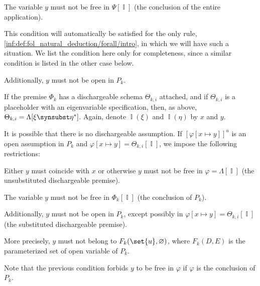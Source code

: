 \begin{definition}
\begin{thmenum}[resume=def:fol_natural_deduction_proof_tree]
\begin{thmenum}[series=def:fol_natural_deduction_proof_tree/application]
\begin{thmenum}
         The variable \( y \) must not be free in \( \Psi[\BbbI] \) (the conclusion of the entire application).

        This condition will automatically be satisfied for the only rule, \ref{inf:def:fol_natural_deduction/forall/intro}, in which we will have such a situation. We list the condition here only for completeness, since a similar condition is listed in the other case below.

         Additionally, \( y \) must not be open in \( P_k \).
      \end{thmenum}

       If the premise \( \Phi_k \) has a dischargeable schema \( \Theta_{k,i} \) attached, and if \( \Theta_{k,i} \) is a placeholder with an eigenvariable specification, then, as above, \( \Theta_{k,i} = \Lambda[\xi \synsubst \eta^*] \). Again, denote \( \BbbI(\xi) \) and \( \BbbI(\eta) \) by \( x \) and \( y \).

      It is possible that there is no dischargeable assumption. If \( [\varphi[x \mapsto y]]^u \) is an open assumption in \( P_k \) and \( \varphi[x \mapsto y] = \Theta_{k,i}[\BbbI] \), we impose the following restrictions:
      \begin{thmenum}
         Either \( y \) must coincide with \( x \) or otherwise \( y \) must not be free in \( \varphi = \Lambda[\BbbI] \) (the unsubstituted dischargeable premise).

         The variable \( y \) must not be free in \( \Phi_k[\BbbI] \) (the conclusion of \( P_k \)).

         Additionally, \( y \) must not be open in \( P_k \), except possibly in \( \varphi[x \mapsto y] = \Theta_{k,i}[\BbbI] \) (the substituted dischargeable premise).

        More precisely, \( y \) must not belong to \( F_k(\set{ u }, \varnothing) \), where \( F_k(D, E) \) is the parameterized set of open variable of \( P_k \).

        Note that the previous condition forbids \( y \) to be free in \( \varphi \) if \( \varphi \) is the conclusion of \( P_k \).
      \end{thmenum}
    \end{thmenum}


\end{thmenum}
\end{definition}
